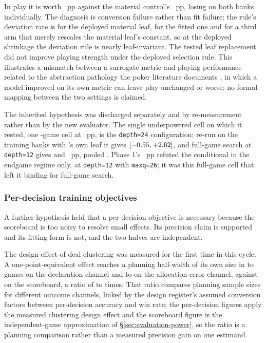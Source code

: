 In play it is worth \vsevenKoneInPlay{}~pp against the material control's \vsevenKoneControl{}~pp,
losing on both banks individually. The diagnosis is conversion failure rather than fit failure: the
rule's deviation rate is \vsevenKoneChangeLo{} for the deployed material leaf,
\vsevenKoneChangeMid{} for the fitted one and \vsevenKoneChangeHi{} for a third arm that merely
rescales the material leaf's constant, so at the deployed shrinkage the deviation rule is nearly
leaf-invariant. The tested leaf replacement did not improve playing strength under the deployed
selection rule. This illustrates a mismatch between a surrogate metric and playing performance
related to the abstraction pathology the poker literature documents \cite{waugh-abstraction}, in
which a model improved on its own metric can leave play unchanged or worse; no formal mapping
between the two settings is claimed.

The inherited hypothesis was discharged separately and by re-measurement rather than by the new
evaluator. The single underpowered cell on which it rested, one \vsevenFullGameOldN{}-game cell at
\vsevenFullGameOld{}~pp, is the \texttt{depth=24} configuration; re-run on the training banks with
\vsix{}'s own leaf it gives \vsevenDepthTwentyFour{}
$[-0.55, +2.62]$, and full-game search at \texttt{depth=12}
gives \vsevenFullGameReOne{} and \vsevenFullGameReTwo{}~pp, pooled \vsevenFullGameRePooled{}.
Phase 1's \vsevenTruncatedEndgame{}~pp refuted the conditional in the endgame regime only, at
\texttt{depth=12} with \texttt{maxq=26}; it was this full-game cell that left it binding for
full-game search.

\subsubsection{Per-decision training objectives}
\label{sec:development-perdecision}

A further hypothesis held that a per-decision objective is necessary because the scoreboard is too
noisy to resolve small effects. Its precision claim is supported and its fitting form is not, and
the two halves are independent.

The design effect of deal clustering was measured for the first time in this cycle. A
one-point-equivalent effect reaches a planning half-width of its own size in
\vsevenPerDecisionGamesLo{} to \vsevenPerDecisionGamesHi{} games on the declaration channel and
\vsevenAllocGamesLo{} to \vsevenAllocGamesHi{} on the allocation-error channel, against
\vsevenScoreboardGames{} on the scoreboard, a ratio of \vsevenDesignEffectLo{} to
\vsevenDesignEffectHi{} times. That ratio compares planning sample sizes for different outcome
channels, linked by the design register's assumed conversion factors between per-decision accuracy
and win rate; the per-decision figures apply the measured clustering design effect and the
scoreboard figure is the independent-game approximation of \S\ref{sec:evaluation-power}, so the
ratio is a planning comparison rather than a measured precision gain on one estimand.

